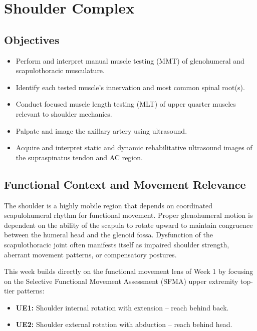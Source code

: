 \chapter{Shoulder Complex}\label{chp:shoulder_complex}

\section*{Objectives}
\begin{itemize}
  \item Perform and interpret manual muscle testing (MMT) of glenohumeral and scapulothoracic musculature.
  \item Identify each tested muscle’s innervation and most common spinal root(s).
  \item Conduct focused muscle length testing (MLT) of upper quarter muscles relevant to shoulder mechanics.
  \item Palpate and image the axillary artery using ultrasound.
  \item Acquire and interpret static and dynamic rehabilitative ultrasound images of the supraspinatus tendon and AC region.
\end{itemize}

\section*{Functional Context and Movement Relevance}

The shoulder is a highly mobile region that depends on coordinated scapulohumeral rhythm for functional movement. Proper glenohumeral motion is dependent on the ability of the scapula to rotate upward to maintain congruence between the humeral head and the glenoid fossa. Dysfunction of the scapulothoracic joint often manifests itself as impaired shoulder strength, aberrant movement patterns, or compensatory postures.

This week builds directly on the functional movement lens of Week 1 by focusing on the Selective Functional Movement Assessment (SFMA) upper extremity top-tier patterns:

\begin{itemize}
  \item \textbf{UE1:} Shoulder internal rotation with extension – reach behind back.
  \item \textbf{UE2:} Shoulder external rotation with abduction – reach behind head.
\end{itemize}

